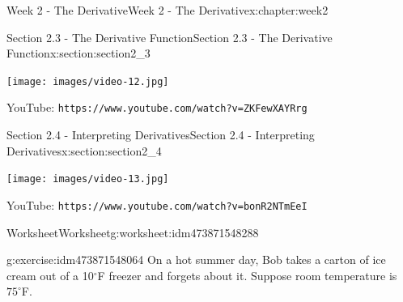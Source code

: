 \documentclass[oneside,10pt,]{book}
\newcommand{\mono}[1]{\texttt{#1}}
\numberwithin{equation}{section}
\newlength{\qrsize}
\newlength{\previewwidth}
\begin{document}
\begin{chapterptx}{Week 2 - The Derivative}{}{Week 2 - The Derivative}{}{}{x:chapter:week2}
\begin{sectionptx}{Section 2.3 - The Derivative Function}{}{Section 2.3 - The Derivative Function}{}{}{x:section:section2_3}
\begin{tcbraster}[raster columns=2, raster column skip=1pt, raster halign=center, raster force size=false, raster left skip=0pt, raster right skip=0pt]
\begin{tcolorbox}[previewstyle, width=\previewwidth]
\texttt{[image: images/video-12.jpg]}%
\end{tcolorbox}%
\begin{tcolorbox}[qrstyle]%
{\hypersetup{urlcolor=black}}%
\end{tcolorbox}%
\begin{tcolorbox}[captionstyle]%
\small YouTube: \mono{https://www.youtube.com/watch?v=ZKFewXAYRrg}\end{tcolorbox}%
\end{tcbraster}%
\end{sectionptx}
%
%
\typeout{************************************************}
\typeout{************************************************}
%
\begin{sectionptx}{Section 2.4 - Interpreting Derivatives}{}{Section 2.4 - Interpreting Derivatives}{}{}{x:section:section2_4}
\setlength{\qrsize}{9em}
\setlength{\previewwidth}{\linewidth}
\addtolength{\previewwidth}{-\qrsize}
\begin{tcbraster}[raster columns=2, raster column skip=1pt, raster halign=center, raster force size=false, raster left skip=0pt, raster right skip=0pt]%
\begin{tcolorbox}[previewstyle, width=\previewwidth]%
\texttt{[image: images/video-13.jpg]}%
\end{tcolorbox}%
\begin{tcolorbox}[qrstyle]%
{\hypersetup{urlcolor=black}}%
\end{tcolorbox}%
\begin{tcolorbox}[captionstyle]%
\small YouTube: \mono{https://www.youtube.com/watch?v=bonR2NTmEeI}\end{tcolorbox}%
\end{tcbraster}%
%
%
\typeout{************************************************}
\typeout{************************************************}
%
\begin{worksheet-subsection}{Worksheet}{}{Worksheet}{}{}{g:worksheet:idm473871548288}
\begin{divisionexercise}{1}{}{}{g:exercise:idm473871548064}%
On a hot summer day, Bob takes a carton of ice cream out of a 10\(^\circ\)F freezer and forgets about it. Suppose room temperature is \(75^\circ\)F.%
%
\begin{enumerate}[label=(\alph*)]

\end{enumerate}
\end{divisionexercise}
\end{worksheet-subsection}
\end{sectionptx}
\end{chapterptx}
\end{document}
